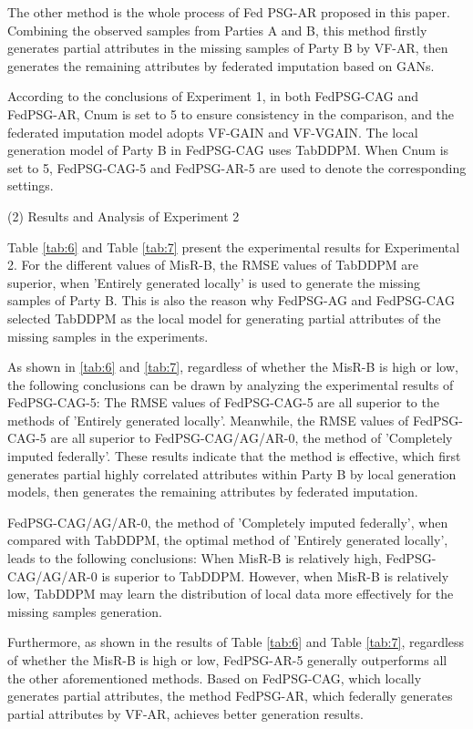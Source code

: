 \documentclass[final,1p,times]{elsarticle}
\begin{document}
The other method is the whole process of Fed
PSG-AR proposed in this paper. Combining the observed samples from Parties A and B, this method firstly generates partial attributes in the missing samples of Party B by VF-AR, then generates the remaining attributes by federated imputation based on GANs.

According to the conclusions of Experiment 1, in both FedPSG-CAG and FedPSG-AR, Cnum is set to 5 to ensure consistency in the comparison, and the federated imputation model adopts VF-GAIN and VF-VGAIN. The local generation model of Party B in FedPSG-CAG uses TabDDPM. When Cnum is set to 5, FedPSG-CAG-5 and FedPSG-AR-5 are used to denote the corresponding settings.

(2) Results and Analysis of Experiment 2

Table \ref{tab:6} and Table \ref{tab:7} present the experimental results for Experimental 2. For the different values of MisR-B, the RMSE values of TabDDPM are superior, when 'Entirely generated locally' is used to generate the missing samples of Party B. This is also the reason why FedPSG-AG and FedPSG-CAG selected TabDDPM as the local model for generating partial attributes of the missing samples in the experiments.

As shown in \ref{tab:6} and \ref{tab:7}, regardless of whether the MisR-B is high or low, the following conclusions can be drawn by analyzing the experimental results of FedPSG-CAG-5: The RMSE values of FedPSG-CAG-5 are all superior to the methods of 'Entirely generated locally'. Meanwhile, the RMSE values of FedPSG-CAG-5 are all superior to FedPSG-CAG/AG/AR-0, the method of 'Completely imputed federally'. These results indicate that the method is effective, which first generates partial highly correlated attributes within Party B by local generation models, then generates the remaining attributes by federated imputation.

FedPSG-CAG/AG/AR-0, the method of 'Completely imputed federally', when compared with TabDDPM, the optimal method of 'Entirely generated locally', leads to the following conclusions: When MisR-B is relatively high, FedPSG-CAG/AG/AR-0 is superior to TabDDPM. However, when MisR-B is relatively low, TabDDPM may learn the distribution of local data more effectively for the missing samples generation.

Furthermore, as shown in the results of Table \ref{tab:6} and Table \ref{tab:7}, regardless of whether the MisR-B is high or low, FedPSG-AR-5 generally outperforms all the other aforementioned methods. Based on FedPSG-CAG, which locally generates partial attributes, the method FedPSG-AR, which federally generates partial attributes by VF-AR, achieves better generation results. 
\end{document}
